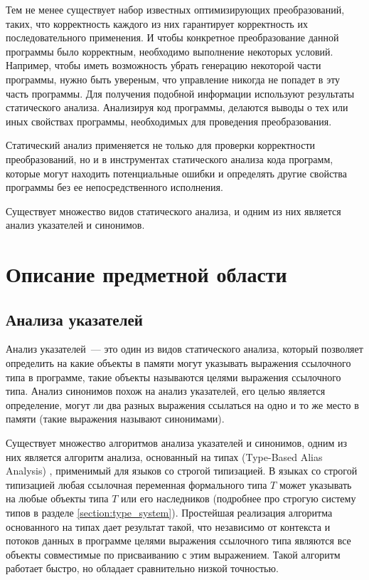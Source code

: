 \documentclass[14pt,titlepage]{extarticle}
\newcommand{\eng}[1]{{\English#1}}
\let\oldsection\section
\renewcommand{\section}{\newpage\oldsection}
\begin{document}
    Тем не менее существует набор известных оптимизирующих преобразований,
    таких, что корректность каждого из них гарантирует корректность их
    последовательного применения.
    И чтобы конкретное преобразование данной программы было корректным,
    необходимо выполнение некоторых условий. Например, чтобы иметь
    возможность убрать генерацию некоторой части программы, нужно быть
    увереным, что управление никогда не попадет в эту часть программы.
    Для получения подобной информации используют результаты статического
    анализа. Анализируя код программы, делаются выводы о тех или иных свойствах
    программы, необходимых для проведения преобразования.

    Статический анализ применяется не только для проверки
    корректности преобразований, но и в инструментах статического анализа
    кода программ, которые могут находить потенциальные ошибки и определять
    другие свойства программы без ее непосредственного исполнения.

    Существует множество видов статического анализа, и одним из них
    является анализ указателей и синонимов.

  \section{Описание предметной области}

    \subsection{Анализа указателей}
    \label{section:analysis_overview}

      Анализ указателей~--- это один из видов статического анализа, который
      позволяет определить на какие объекты в памяти могут указывать выражения
      ссылочного типа в программе, такие объекты называются целями выражения
      ссылочного типа. Анализ синонимов похож на анализ указателей, его целью
      является определение, могут ли два разных выражения ссылаться на одно и то
      же место в памяти (такие выражения называют синонимами).

      Существует множество алгоритмов анализа указателей и синонимов,
      одним из них является алгоритм анализа, основанный на типах
      (\eng{Type-Based Alias Analysis}) \cite{diwan_tbaa},
      применимый для языков со строгой типизацией.
      В языках со строгой типизацией любая ссылочная переменная формального типа
      $T$ может указывать на любые объекты типа $T$ или его наследников
      (подробнее про строгую систему типов в разделе \ref{section:type_system}).
      Простейшая реализация алгоритма основанного на типах дает результат такой,
      что независимо от контекста и потоков данных в программе целями выражения
      ссылочного типа являются все объекты совместимые по присваиванию с этим
      выражением.
      Такой алгоритм работает быстро, но обладает сравнительно низкой точностью.
\end{document}
